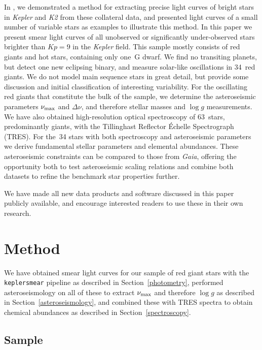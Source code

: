 \documentclass[a4paper,fleqn,usenatbib]{mnras}
\newcommand{\numax}{\mbox{$\nu_{\rm max}$}\xspace}
\newcommand{\Dnu}{\mbox{$\Delta \nu$}\xspace}
\newcommand{\logg}{\mbox{$\log g$}\xspace}
\newcommand{\kepler}{\emph{Kepler}\xspace}
\newcommand{\ktwo}{\emph{K2}\xspace}
\newcommand{\gaia}{\emph{Gaia}\xspace}
\begin{document}
In \citet{smear}, we demonstrated a method for extracting precise light curves of bright stars in \kepler and \ktwo from these collateral data, and presented light curves of a small number of variable stars as examples to illustrate this method. In this paper we present smear light curves of all unobserved or significantly under-observed stars brighter than $Kp=9$ in the \kepler field. This sample mostly consists of red giants and hot stars, containing only one~G dwarf. We find no transiting planets, but detect one new eclipsing binary, and measure solar-like oscillations in 34~red giants. We do not model main sequence stars in great detail, but provide some discussion and initial classification of interesting variability. For the oscillating red giants that constitute the bulk of the sample, we determine the asteroseismic parameters \numax and \Dnu, and therefore stellar masses and \logg measurements. We have also obtained high-resolution optical spectroscopy of 63~stars, predominantly giants, with the Tillinghast Reflector \'{E}chelle Spectrograph (TRES). For the~34 stars with both spectroscopy and asteroseismic parameters we derive fundamental stellar parameters and elemental abundances. These asteroseismic constraints can be compared to those from \gaia, offering the opportunity both to test asteroseismic scaling relations and combine both datasets to refine the benchmark star properties further.

We have made all new data products and software discussed in this paper publicly available, and encourage interested readers to use these in their own research.   

\section{Method}
\label{method}

We have obtained smear light curves for our sample of red giant stars with the \texttt{keplersmear} pipeline as described in Section~\ref{photometry}, performed asteroseismology on all of these to extract \numax and therefore \logg as described in Section~\ref{asteroseismology}, and combined these with TRES spectra to obtain chemical abundances as described in Section~\ref{spectroscopy}. 

\subsection{Sample}
\label{sample}
\end{document}

